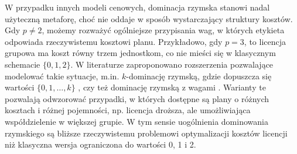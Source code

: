 
W przypadku innych modeli cenowych, dominacja rzymska stanowi nadal użyteczną metaforę, choć nie oddaje w sposób wystarczający struktury kosztów. Gdy $p \neq 2$, możemy rozważyć ogólniejsze przypisania wag, w których etykieta odpowiada rzeczywistemu kosztowi planu. Przykładowo, gdy $p=3$, to licencja grupowa ma koszt równy trzem jednostkom, co nie mieści się w klasycznym schemacie $\{0,1,2\}$. W literaturze zaproponowano rozszerzenia pozwalające modelować takie sytuacje, m.in. $k$-dominację rzymską, gdzie dopuszcza się wartości $\{0,1,\dots,k\}$ \cite{CHAUDHARY2024301}, czy też dominację rzymską z wagami \cite{Ghaffari2020}. Warianty te pozwalają odwzorować przypadki, w których dostępne są plany o różnych kosztach i różnej pojemności, np. licencja droższa, ale umożliwiająca współdzielenie w większej grupie. W tym sensie uogólnienia dominowania rzymskiego są bliższe rzeczywistemu problemowi optymalizacji kosztów licencji niż klasyczna wersja ograniczona do wartości 0, 1 i 2.


